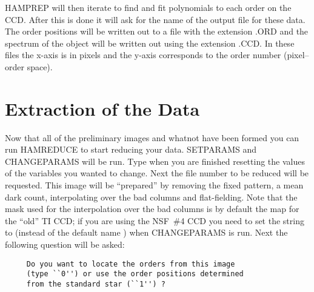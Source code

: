 {\tenit HAMPREP} will then iterate to find and fit polynomials to each order
on the CCD.  After this is done it will ask for the name of the output file
for these data.  The order positions will be written out to a file with the
extension .ORD and the spectrum of the object will be written out using the
extension .CCD. In these files the x-axis is in pixels and the y-axis
corresponds to the order number (pixel--order space).


\section{Extraction of the Data}
\label{sec:hamextract}

Now that all of the preliminary images and whatnot have been formed you can
run {\tenit HAMREDUCE} to start reducing your data.  {\tenit SETPARAMS} and
{\tenit CHANGEPARAMS} will be run. Type  when you are finished
resetting the values of the variables you wanted to change. Next the file
number to be reduced will be requested.  This image will be ``prepared'' by
removing the fixed pattern, a mean dark count, interpolating over the bad
columns  and flat-fielding. Note that the mask used for the interpolation over
the bad columns is by default the map for the ``old'' TI CCD; if you are using
the NSF~\#4 CCD you need to set the string  to
 (instead of the default name ) when
{\tenit CHANGEPARAMS} is run. Next the following question will be asked:

\begin{verbatim}
     Do you want to locate the orders from this image
     (type ``0'') or use the order positions determined
     from the standard star (``1'') ?
\end{verbatim}

